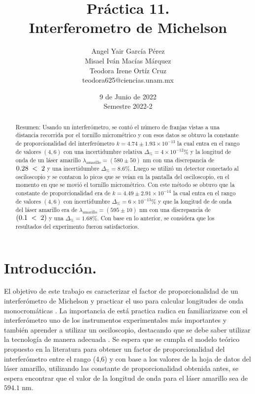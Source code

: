 \documentclass[DIV=calc, paper=a4, fontsize=10.5pt]{scrartcl}
\title{Práctica 11. \\ %
Interferometro de Michelson} %
\author{Angel Yair García Pérez \\
Misael Iván Macías Márquez\\
Teodora Irene Ortíz Cruz\\
\small{teodora625@ciencias.unam.mx}\\}
\date{9 de Junio de 2022\\Semestre 2022-2}
\begin{document}
\maketitle
{}
\begin{abstract}

  \textcolor{carmine}{Resumen:} Usando un interferómetro, se contó el número de franjas vistas a una distancia recorrida por el tornillo micrométrico y con esos datos se obtuvo la constante de proporcionalidad del interferómetro $k = 4.74 \pm 1.93\times 10^{-13}$ la cual entra en el rango de valores $(4,6)$ con una  incertidumbre relativa $\Delta_{\%} = 4\times 10^{-12}\%$ y la longitud de onda de un láser amarillo $\lambda_{\text{amarillo}} = (580 \pm 50) \text{ nm}$ con una discrepancia de $0.28\hspace{0.1cm}<\hspace{0.1cm}2$ y una incertidumbre  $\Delta_{\%}=8.6\%$. Luego se utilizó un detector conectado al osciloscopio y se contaron lo picos que se veían en la pantalla del osciloscopio, en el momento en que se movió el tornillo micrométrico. Con este método se obtuvo que la constante de proporcionalidad era de $k= 4.49 \pm 2.91 \times 10^{-14}$ la cual entra en el rango de valores $(4,6)$  con incertidumbre  $\Delta_{\%} = 6 \times 10^{-13}\%$ y que la longitud de de onda del láser amarillo era de $\lambda_{\text{amarillo}} = (595 \pm 10) \text{ nm}$ con una discrepancia de $(0.1\hspace{0.1cm}<\hspace{0.1cm}2)$ y una $\Delta_{\%}=1.68\%$. Con base en lo anterior, se considera que los resultados del experimento fueron satisfactorios.
\end{abstract}
\section*{\textcolor{carmine}{Introducción.}}
El objetivo de este trabajo es caracterizar el factor de proporcionalidad de un interferómetro de Michelson y practicar el uso para calcular longitudes de onda monocromáticas \cite{Manual}. La importancia de está practica radica en familiarizarse con el interferómetro uno de los instrumentos experimentales más importantes y también aprender a utilizar un osciloscopio, destacando que se debe saber utilizar la tecnología de manera adecuada \cite{Manual}. Se espera que se cumpla el modelo teórico propuesto en la literatura \cite{book} para obtener un factor de proporcionalidad  del interferómetro entre el rango (4,6) y con base a los valores de la hoja de datos del láser amarillo, utilizando las constante de proporcionalidad obtenida antes, se espera encontrar que el valor de la longitud de onda para el láser amarillo sea de $594.1\text{ nm}$. 
\end{document}
